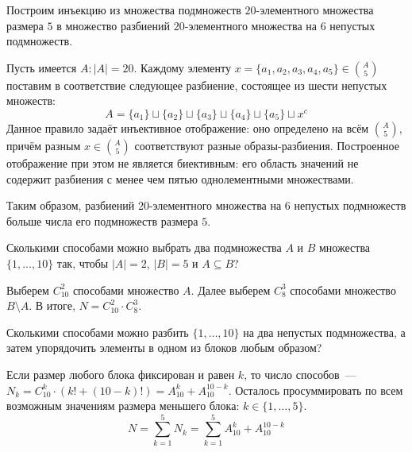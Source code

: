 \begin{Answer}
    \noindent
    Построим инъекцию из множества подмножеств $ 20 $-элементного множества размера $ 5 $
    в множество разбиений $ 20 $-элементного множества на $ 6 $ непустых подмножеств.

    Пусть имеется $ A: |A| = 20 $.
    Каждому элементу $ x = \{a_1, a_2, a_3, a_4, a_5\} \in \binom{A}{5} $ поставим в соответствие следующее разбиение,
    состоящее из шести непустых множеств:
    \[
        A = \{a_1\} \sqcup \{a_2\} \sqcup \{a_3\} \sqcup \{a_4\} \sqcup \{a_5\} \sqcup x^c
    \]
    Данное правило задаёт инъективное отображение:
    оно определено на всём $ \binom{A}{5} $,
    причём разным $ x \in \binom{A}{5} $ соответствуют разные образы-разбиения.
    Построенное отображение при этом не является биективным:
    его область значений не содержит разбиения с менее чем пятью однолементными множествами.

    Таким образом, разбиений $ 20 $-элементного множества на $ 6 $ непустых подмножеств
    больше числа его подмножеств размера $ 5 $.
\end{Answer}


\begin{Exercise}[counter=SecExercise]
    \noindent
    Сколькими способами можно выбрать два подмножества $ A $ и $ B $ множества $ \{1, \ldots, 10 \} $ так, чтобы $ |A| = 2 $, $ |B| = 5 $ и $ A \subseteq B $?
\end{Exercise}

\begin{Answer}
    \noindent
    Выберем $ C_{10}^2 $ способами множество $ A $.
    Далее выберем $ C_8^3 $ способами множество $ B \setminus A $.
    В итоге, $ N = C_{10}^2 \cdot C_8^3 $.
\end{Answer}


\begin{Exercise}[counter=SecExercise]
    \noindent
    Сколькими способами можно разбить $ \{ 1, \ldots, 10 \} $ на два непустых подмножества, а затем упорядочить элементы в одном из блоков любым образом?
\end{Exercise}

\begin{Answer}
    \noindent
    Если размер любого блока фиксирован и равен $ k $, то число способов~--- $ N_k = C_{10}^k \cdot (k! + (10 - k)!) = A_{10}^k + A_{10}^{10-k} $.
    Осталось просуммировать по всем возможным значениям размера меньшего блока: $ k \in \{1, \ldots, 5 \} $.
    \[
        N = \sum_{k=1}^5 N_k = \sum_{k=1}^5 A_{10}^k + A_{10}^{10-k}
    \]
\end{Answer}


